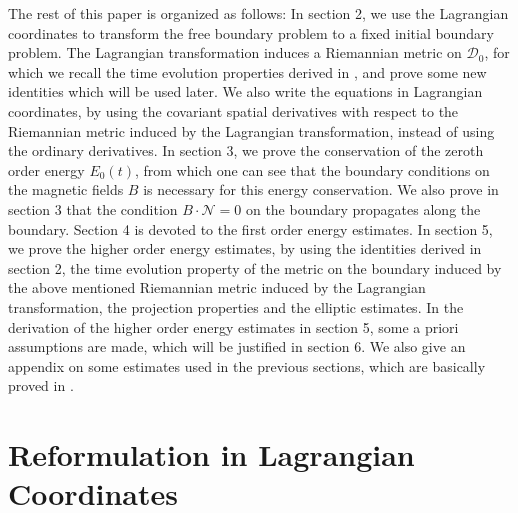 \documentclass[12pt,reqno]{amsart}
\numberwithin{equation}{section}
\theoremstyle{definition}
\theoremstyle{remark}
\begin{document}
The rest of this paper is organized as follows: In section 2, we use the Lagrangian coordinates to transform the free boundary problem to a fixed initial boundary problem. The Lagrangian transformation induces a Riemannian metric on ${{\mathscr{D}}}_0$, for which we recall the time evolution properties derived in \cite{CL00}, and prove some new identities which will be used later. We also write the equations in Lagrangian coordinates, by using the covariant spatial derivatives with respect to the Riemannian metric induced by the Lagrangian transformation, instead of using the ordinary derivatives. In section 3, we prove the conservation of the zeroth order energy $E_0(t)$, from which one can see that the boundary conditions on the magnetic fields $B$ is necessary for this energy conservation. We also prove in section 3 that the condition $B\cdot {\mathcal{N}}=0$ on the boundary propagates along the boundary. Section 4 is devoted to the first order energy estimates. In section 5, we prove the higher order energy estimates, by using the identities derived in section 2, the time evolution property of the metric on the boundary induced by the above mentioned Riemannian metric induced by the Lagrangian transformation, the projection properties and the elliptic estimates. In the derivation of the higher order energy estimates in section 5, some a priori assumptions are made, which will be justified in section 6. We also give an appendix on some estimates used in the previous sections, which are basically proved in \cite{CL00}.

\section{Reformulation in Lagrangian Coordinates}
\end{document}
